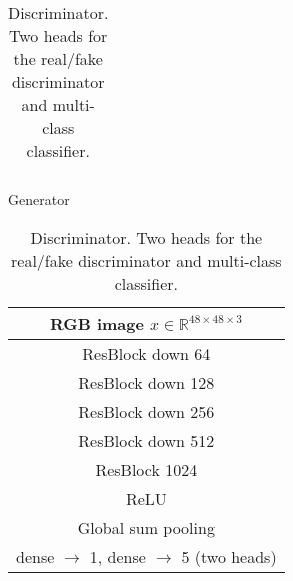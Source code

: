 \documentclass{article}
\newcommand{\bbR}{\mathbb{R}}
\begin{document}
\begin{table}[ht!]
\begin{subtable}{.33\textwidth}
{\begin{tabular}{c}
                  \midrule
                  \bottomrule
              \end{tabular}}
              \caption{Generator}
          \end{subtable}
          \begin{subtable}{.32\textwidth}
              \centering
              {\begin{tabular}{c}
                  \toprule
                  \midrule
                  RGB image $x\in \bbR^{48\times 48 \times 3}$ \\
                  \midrule
                  ResBlock down 64\\
                  \midrule
                  ResBlock down 128\\
                  \midrule
                  ResBlock down 256\\
                  \midrule
                  ResBlock down 512\\
                  \midrule
                  ResBlock 1024\\
                  \midrule
                  ReLU\\
                  \midrule
                  Global sum pooling\\
                  \midrule
                  dense $\rightarrow$ 1, dense $\rightarrow$ 5 (two heads)\\
                  \midrule
                  \bottomrule
              \end{tabular}}
              \caption{Discriminator. Two heads for the real/fake discriminator and multi-class classifier.}
          \end{subtable}
\end{table}
 
\end{document}
